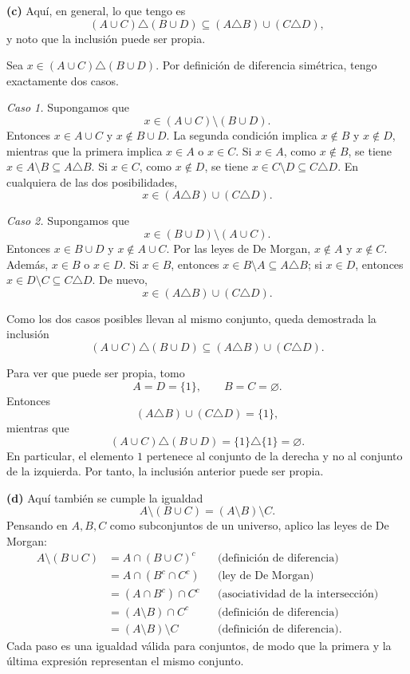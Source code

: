 \documentclass[11pt]{article}
\begin{document}
\begin{solution}
\textbf{(c)} Aquí, en general, lo que tengo es
\[
\boxed{(A\cup C)\triangle(B\cup D)
\subseteq(A\triangle B)\cup(C\triangle D)},
\]
y noto que la inclusión puede ser propia.

Sea $x\in(A\cup C)\triangle(B\cup D)$. Por definición de diferencia
simétrica, tengo exactamente dos casos.

\emph{Caso 1.} Supongamos que
\[
x\in(A\cup C)\setminus(B\cup D).
\]
Entonces $x\in A\cup C$ y $x\notin B\cup D$. La segunda condición implica
$x\notin B$ y $x\notin D$, mientras que la primera implica $x\in A$ o
$x\in C$. Si $x\in A$, como $x\notin B$, se tiene
$x\in A\setminus B\subseteq A\triangle B$. Si $x\in C$, como $x\notin D$,
se tiene $x\in C\setminus D\subseteq C\triangle D$. En cualquiera de las dos
posibilidades,
\[
x\in(A\triangle B)\cup(C\triangle D).
\]

\emph{Caso 2.} Supongamos que
\[
x\in(B\cup D)\setminus(A\cup C).
\]
Entonces $x\in B\cup D$ y $x\notin A\cup C$. Por las leyes de De Morgan,
$x\notin A$ y $x\notin C$. Además, $x\in B$ o $x\in D$. Si $x\in B$,
entonces $x\in B\setminus A\subseteq A\triangle B$; si $x\in D$, entonces
$x\in D\setminus C\subseteq C\triangle D$. De nuevo,
\[
x\in(A\triangle B)\cup(C\triangle D).
\]

Como los dos casos posibles llevan al mismo conjunto, queda demostrada la
inclusión
\[
(A\cup C)\triangle(B\cup D)
\subseteq(A\triangle B)\cup(C\triangle D).
\]

Para ver que puede ser propia, tomo
\[
A=D=\{1\},\qquad B=C=\varnothing.
\]
Entonces
\[
(A\triangle B)\cup(C\triangle D)=\{1\},
\]
mientras que
\[
(A\cup C)\triangle(B\cup D)=\{1\}\triangle\{1\}=\varnothing.
\]
En particular, el elemento $1$ pertenece al conjunto de la derecha y no al
conjunto de la izquierda. Por tanto, la inclusión anterior puede ser propia.

\textbf{(d)} Aquí también se cumple la igualdad
\[
\boxed{A\setminus(B\cup C)=(A\setminus B)\setminus C}.
\]
Pensando en $A,B,C$ como subconjuntos de un universo, aplico las leyes de De Morgan:
\begin{align*}
A\setminus(B\cup C)
&=A\cap(B\cup C)^c
&&\text{(definición de diferencia)}\\
&=A\cap(B^c\cap C^c)
&&\text{(ley de De Morgan)}\\
&=(A\cap B^c)\cap C^c
&&\text{(asociatividad de la intersección)}\\
&=(A\setminus B)\cap C^c
&&\text{(definición de diferencia)}\\
&=(A\setminus B)\setminus C
&&\text{(definición de diferencia).}
\end{align*}
Cada paso es una igualdad válida para conjuntos, de modo que la primera y la
última expresión representan el mismo conjunto.
\end{solution}
\end{document}
